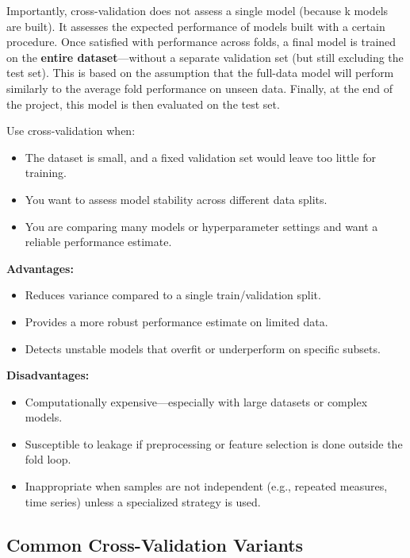 \documentclass[12pt,openany, draft]{book}
\begin{document}
Importantly, cross-validation does not assess a single model (because k models are built).
It assesses the expected performance of models built with a certain procedure. Once satisfied with performance across folds, a final model is trained on the \textbf{entire dataset}—without a separate validation set (but still excluding the test set). This is based on the assumption that the full-data model will perform similarly to the average fold performance on unseen data. Finally, at the end of the project, this model is then evaluated on the test set.
\newline

Use cross-validation when:
\begin{itemize}
    \item The dataset is small, and a fixed validation set would leave too little for training.
    \item You want to assess model stability across different data splits.
    \item You are comparing many models or hyperparameter settings and want a reliable performance estimate.
\end{itemize} 

\textbf{Advantages:}
\begin{itemize}
    \item Reduces variance compared to a single train/validation split.
    \item Provides a more robust performance estimate on limited data.
    \item Detects unstable models that overfit or underperform on specific subsets.
\end{itemize} 

\textbf{Disadvantages:}
\begin{itemize}
    \item Computationally expensive—especially with large datasets or complex models.
    \item Susceptible to leakage if preprocessing or feature selection is done outside the fold loop.
    \item Inappropriate when samples are not independent (e.g., repeated measures, time series) unless a specialized strategy is used.
\end{itemize} 

\subsection{Common Cross-Validation Variants}
\end{document}
